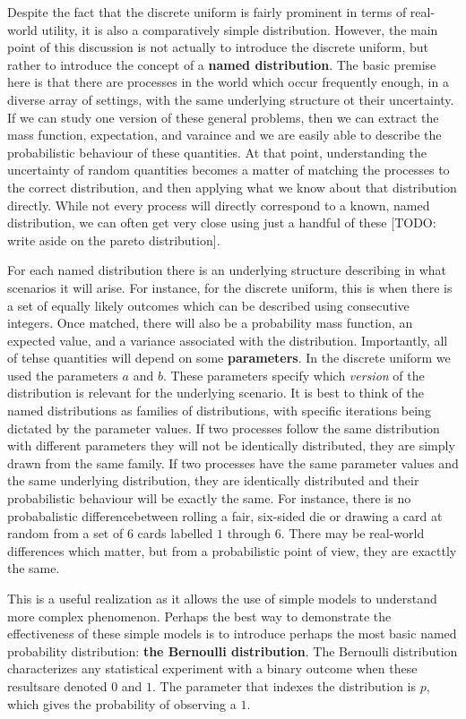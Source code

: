 \documentclass[
  letterpaper,
  DIV=11,
  numbers=noendperiod]{scrreprt}
\begin{document}
Despite the fact that the discrete uniform is fairly prominent in terms
of real-world utility, it is also a comparatively simple distribution.
However, the main point of this discussion is not actually to introduce
the discrete uniform, but rather to introduce the concept of a
\textbf{named distribution}. The basic premise here is that there are
processes in the world which occur frequently enough, in a diverse array
of settings, with the same underlying structure ot their uncertainty. If
we can study one version of these general problems, then we can extract
the mass function, expectation, and varaince and we are easily able to
describe the probabilistic behaviour of these quantities. At that point,
understanding the uncertainty of random quantities becomes a matter of
matching the processes to the correct distribution, and then applying
what we know about that distribution directly. While not every process
will directly correspond to a known, named distribution, we can often
get very close using just a handful of these {[}TODO: write aside on the
pareto distribution{]}.

For each named distribution there is an underlying structure describing
in what scenarios it will arise. For instance, for the discrete uniform,
this is when there is a set of equally likely outcomes which can be
described using consecutive integers. Once matched, there will also be a
probability mass function, an expected value, and a variance associated
with the distribution. Importantly, all of tehse quantities will depend
on some \textbf{parameters}. In the discrete uniform we used the
parameters \(a\) and \(b\). These parameters specify which
\emph{version} of the distribution is relevant for the underlying
scenario. It is best to think of the named distributions as families of
distributions, with specific iterations being dictated by the parameter
values. If two processes follow the same distribution with different
parameters they will not be identically distributed, they are simply
drawn from the same family. If two processes have the same parameter
values and the same underlying distribution, they are identically
distributed and their probabilistic behaviour will be exactly the same.
For instance, there is no probabalistic differencebetween rolling a
fair, six-sided die or drawing a card at random from a set of \(6\)
cards labelled \(1\) through \(6\). There may be real-world differences
which matter, but from a probabilistic point of view, they are exacttly
the same.

This is a useful realization as it allows the use of simple models to
understand more complex phenomenon. Perhaps the best way to demonstrate
the effectiveness of these simple models is to introduce perhaps the
most basic named probability distribution: \textbf{the Bernoulli
distribution}. The Bernoulli distribution characterizes any statistical
experiment with a binary outcome when these resultsare denoted \(0\) and
\(1\). The parameter that indexes the distribution is \(p\), which gives
the probability of observing a \(1\).
\end{document}
